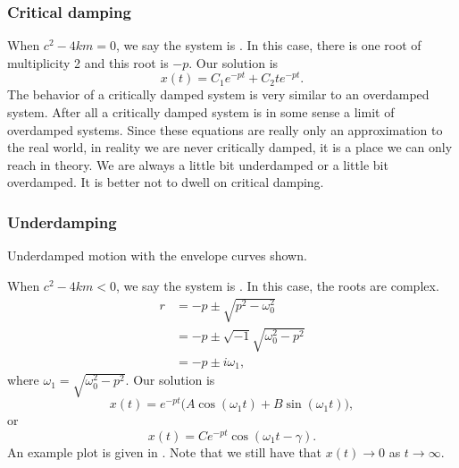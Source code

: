 \documentclass[12pt]{book}
\begin{document}
\subsubsection{Critical damping}

When
$c^2 - 4km = 0$, we say the system is \emph{}.  In this case,
there is one root of multiplicity 2 and this root is $-p$.  Our solution is
\begin{equation*}
x(t) = C_1 e^{-pt} + C_2 t e^{-pt} .
\end{equation*}
The behavior of a critically damped system is very similar to an overdamped
system.  After all a critically damped system is in some sense a limit
of overdamped systems.  Since these equations are really only an
approximation to the real world, in reality we are never critically
damped, it is a place we can only reach in theory.  We are always
a little bit underdamped or a little bit overdamped.  It is better not to
dwell on critical damping.

\subsubsection{Underdamping}

\begin{diffyfloatingfigurepdfonly}{3.1in}
\capstart
\begin{center}
\caption{Underdamped motion with the envelope curves shown.\label{mv:underdampedfig}}
\end{center}
\end{diffyfloatingfigurepdfonly}

When
$c^2 - 4km < 0$, we say the system is \emph{}.  In this case,
the roots are complex.
\begin{equation*}
\begin{split}
r & =
-p \pm \sqrt{p^2 - \omega_0^2} \\
& = 
-p \pm \sqrt{-1}\sqrt{\omega_0^2 - p^2} \\
& = 
-p \pm i \omega_1 ,
\end{split}
\end{equation*}
where $\omega_1 =\sqrt{\omega_0^2 - p^2}$.  Our solution is
\begin{equation*}
x(t) = e^{-pt} \bigl( A \cos (\omega_1 t) + B \sin (\omega_1 t) \bigr) ,
\end{equation*}
or
\begin{equation*}
x(t) = C e^{-pt} \cos ( \omega_1 t - \gamma ) .
\end{equation*}
An example plot is given in .  Note that we
still have that $x(t) \to 0$ as $t \to \infty$.
\end{document}
